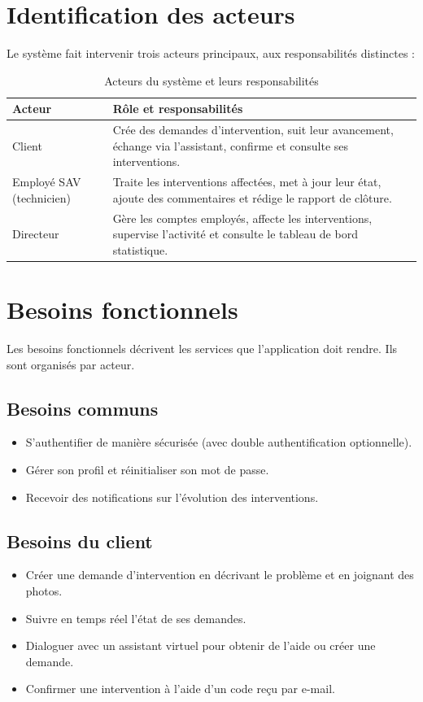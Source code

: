 \section{Identification des acteurs}
Le système fait intervenir trois acteurs principaux, aux responsabilités distinctes :

\begin{table}[H]
\centering
\caption{Acteurs du système et leurs responsabilités}
\begin{tabularx}{\textwidth}{l X}
\toprule
\textbf{Acteur} & \textbf{Rôle et responsabilités} \\
\midrule
Client & Crée des demandes d'intervention, suit leur avancement, échange via l'assistant, confirme et consulte ses interventions. \\
Employé SAV (technicien) & Traite les interventions affectées, met à jour leur état, ajoute des commentaires et rédige le rapport de clôture. \\
Directeur & Gère les comptes employés, affecte les interventions, supervise l'activité et consulte le tableau de bord statistique. \\
\bottomrule
\end{tabularx}
\label{tab:acteurs}
\end{table}

\section{Besoins fonctionnels}
Les besoins fonctionnels décrivent les services que l'application doit rendre. Ils sont organisés par acteur.

\subsection{Besoins communs}
\begin{itemize}
  \item S'authentifier de manière sécurisée (avec double authentification optionnelle).
  \item Gérer son profil et réinitialiser son mot de passe.
  \item Recevoir des notifications sur l'évolution des interventions.
\end{itemize}

\subsection{Besoins du client}
\begin{itemize}
  \item Créer une demande d'intervention en décrivant le problème et en joignant des photos.
  \item Suivre en temps réel l'état de ses demandes.
  \item Dialoguer avec un assistant virtuel pour obtenir de l'aide ou créer une demande.
  \item Confirmer une intervention à l'aide d'un code reçu par e-mail.
\end{itemize}

